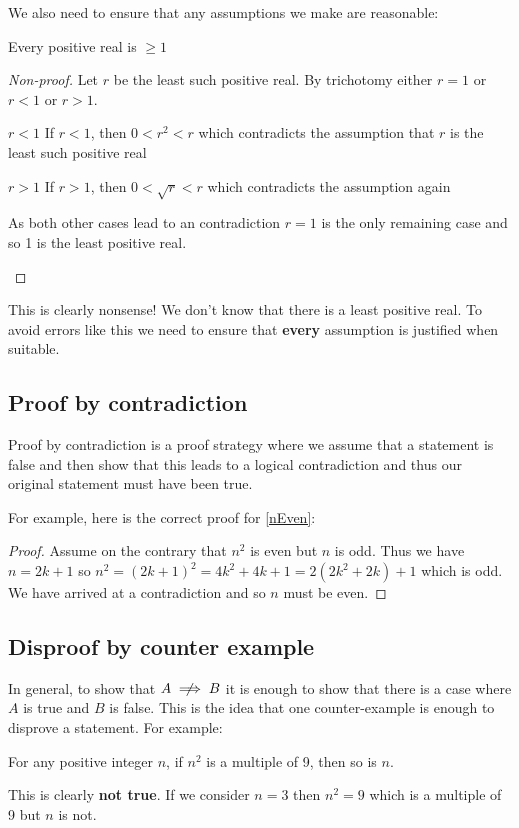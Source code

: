 \documentclass[../main.tex]{subfiles}
\begin{document}
We also need to ensure that any assumptions we make are reasonable:
\begin{proposition}
  Every positive real is $\geq 1$
\end{proposition}
\begin{proof}[Non-proof]
  Let $r$ be the least such positive real.
  By trichotomy either $r = 1$ or $r < 1$ or $r > 1$.
  \begin{proofcases}
    \begin{case}{$r < 1$}
      If $r < 1$, then $0 < r^2 < r$ which contradicts the assumption that $r$ is the least such positive real
    \end{case}
    \begin{case}{$r > 1$}
      If $r > 1$, then $0 < \sqrt{r} < r$ which contradicts the assumption again
    \end{case}
    As both other cases lead to an contradiction $r = 1$ is the only remaining case and so 1 is the least positive real.
  \end{proofcases}
\end{proof}
This is clearly nonsense! We don't know that there is a least positive real.
To avoid errors like this we need to ensure that \textbf{every} assumption is justified when suitable.
\subsection{Proof by contradiction}
Proof by contradiction is a proof strategy where we assume that a statement is false and then show that this leads to a logical contradiction and thus our original statement must have been true.

For example, here is the correct proof for \cref{nEven}:
\begin{proof}
  Assume on the contrary that $n^2$ is even but $n$ is odd.
  Thus we have $n = 2k + 1$ so $n^2 = (2k + 1)^2 = 4k^2 + 4k + 1 = 2(2k^2 + 2k) + 1$ which is odd.
  We have arrived at a contradiction and so $n$ must be even.
\end{proof}
\subsection{Disproof by counter example}
In general, to show that $A \centernot\implies B$ it is enough to show that there is a case where $A$ is true and $B$ is false.
This is the idea that one counter-example is enough to disprove a statement.
For example:
\begin{proposition}
  For any positive integer $n$, if $n^2$ is a multiple of 9, then so is $n$.
\end{proposition}
This is clearly \textbf{not true}. If we consider $n = 3$ then $n^2 = 9$ which is a multiple of 9 but $n$ is not.
\end{document}
